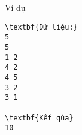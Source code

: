 Ví dụ
\begin{verbatim}
\textbf{Dữ liệu:}
5
5
1 2
4 2
4 5
3 2
3 1

\textbf{Kết qủa}
10
\end{verbatim}